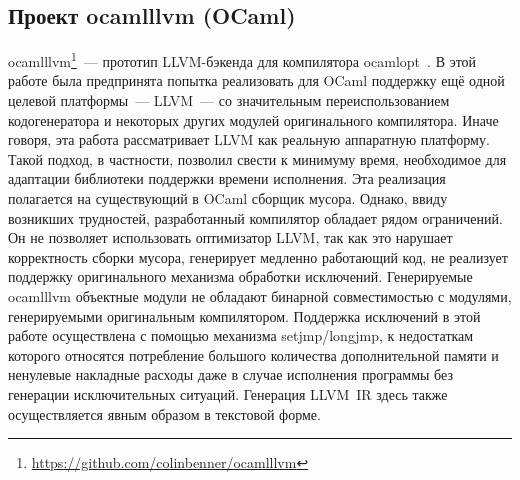\documentclass[a4paper, 12pt]{article}
\begin{document}
\subsection{Проект ocamlllvm (OCaml)}
ocamlllvm\footnote{\url{https://github.com/colinbenner/ocamlllvm}}~--- прототип LLVM-бэкенда для
компилятора ocamlopt~\cite{Benner}. В этой работе была предпринята попытка реализовать для OCaml поддержку ещё одной
целевой платформы~--- LLVM~--- со значительным переиспользованием кодогенератора и некоторых других модулей
оригинального
компилятора. Иначе говоря, эта работа рассматривает LLVM как реальную аппаратную платформу. Такой подход, в частности,
позволил свести к минимуму время, необходимое для адаптации библиотеки поддержки времени исполнения. Эта
реализация полагается на существующий в OCaml сборщик мусора. Однако, ввиду возникших трудностей, разработанный
компилятор обладает рядом ограничений. Он не позволяет использовать оптимизатор LLVM, так как это нарушает корректность
сборки мусора, генерирует медленно работающий код, не реализует поддержку оригинального механизма обработки исключений.
Генерируемые ocamlllvm объектные модули не обладают бинарной совместимостью с модулями, генерируемыми оригинальным
компилятором. Поддержка исключений в этой работе осуществлена с помощью механизма setjmp/longjmp, к недостаткам которого
относятся потребление большого количества дополнительной памяти и ненулевые накладные расходы даже в случае
исполнения программы без генерации исключительных ситуаций. Генерация LLVM~IR здесь также осуществляется явным образом в
текстовой форме.

\newpage
\end{document}
